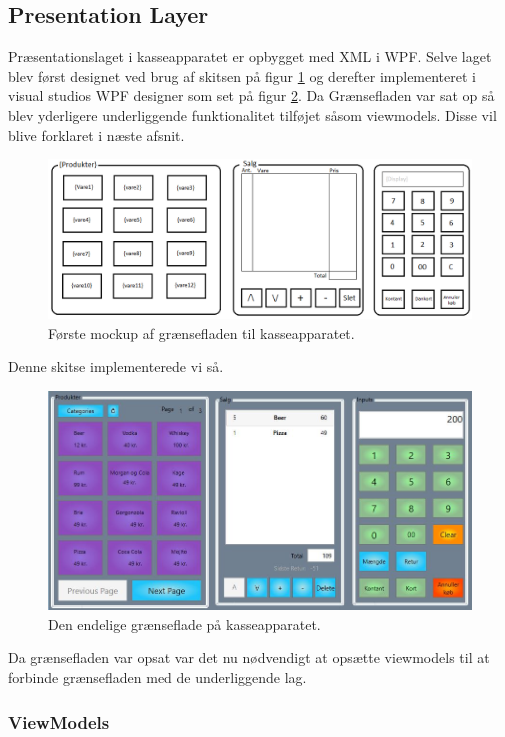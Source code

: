
\subsection{Presentation Layer}
Præsentationslaget i kasseapparatet er opbygget med XML i WPF. Selve laget blev først designet ved brug af skitsen på figur \ref{fig:KasseMockup} og derefter implementeret i visual studios WPF designer som set på figur \ref{fig:EndeligeGUI}. Da Grænsefladen var sat op så blev yderligere underliggende funktionalitet tilføjet såsom viewmodels. Disse vil blive forklaret i næste afsnit.

\begin{figure}[H]
	\centering
	\includegraphics[width=1\textwidth]{Systemdesign/Frontend/pics/KasseMockup}
	\caption{Første mockup af grænsefladen til kasseapparatet.}
	\label{fig:KasseMockup}
\end{figure}

Denne skitse implementerede vi så.

\begin{figure}[H]
	\centering
	\includegraphics[width=1\textwidth]{Systemdesign/Frontend/pics/GUI}
	\caption{Den endelige grænseflade på kasseapparatet.}
	\label{fig:EndeligeGUI}
\end{figure}

Da grænsefladen var opsat var det nu nødvendigt at opsætte viewmodels til at forbinde grænsefladen med de underliggende lag.

\subsubsection{ViewModels}